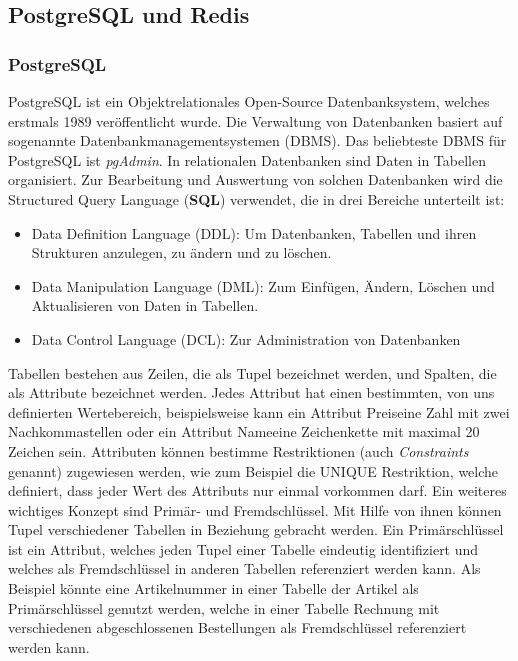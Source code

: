 \documentclass[a4paper,12pt]{report}
\newcommand{\footcite}[1]{\footnotemark\footnotetext{\cite{#1}}}
\begin{document}
        \subsection{PostgreSQL und Redis}
        \subsubsection{PostgreSQL}
        \label{sec:PostgreSQL}
PostgreSQL ist ein Objektrelationales Open-Source Datenbanksystem, welches erstmals 1989 veröffentlicht wurde\footcite{postgresql-book}. Die Verwaltung von Datenbanken basiert auf sogenannte Datenbankmanagementsystemen (DBMS). Das beliebteste DBMS für PostgreSQL ist \textit{pgAdmin}\footcite{pgAdmin}.  In relationalen Datenbanken sind Daten in Tabellen organisiert. Zur Bearbeitung und Auswertung von solchen Datenbanken wird die Structured Query Language (\textbf{SQL}) verwendet, die in drei Bereiche unterteilt ist\footcite{sql-book}:
\begin{itemize}
 \item Data Definition Language (DDL): Um Datenbanken, Tabellen und ihren Strukturen anzulegen, zu ändern und zu löschen.
 \item  Data Manipulation Language (DML): Zum Einfügen, Ändern, Löschen und Aktualisieren von Daten in Tabellen.
 \item Data Control Language (DCL): Zur Administration von Datenbanken
\end{itemize}

Tabellen bestehen aus Zeilen, die als Tupel bezeichnet werden, und Spalten, die als Attribute bezeichnet werden. Jedes Attribut hat einen bestimmten, von uns definierten Wertebereich, beispielsweise kann ein Attribut \glqq Preis\grqq{ }eine Zahl mit zwei Nachkommastellen oder ein Attribut \glqq Name\grqq{ }eine Zeichenkette mit maximal 20 Zeichen sein.  Attributen können bestimme Restriktionen (auch \textit{Constraints} genannt) zugewiesen werden, wie zum Beispiel die UNIQUE Restriktion, welche definiert, dass jeder Wert des Attributs nur einmal vorkommen darf.
Ein weiteres wichtiges Konzept sind Primär- und Fremdschlüssel. Mit Hilfe von ihnen können Tupel verschiedener Tabellen in Beziehung gebracht werden. Ein Primärschlüssel ist ein Attribut, welches jeden Tupel einer Tabelle eindeutig identifiziert und welches als Fremdschlüssel in anderen Tabellen referenziert werden kann. Als Beispiel könnte eine Artikelnummer in einer Tabelle der Artikel als Primärschlüssel genutzt werden, welche in einer Tabelle Rechnung mit verschiedenen abgeschlossenen Bestellungen als Fremdschlüssel referenziert werden kann.
\end{document}
